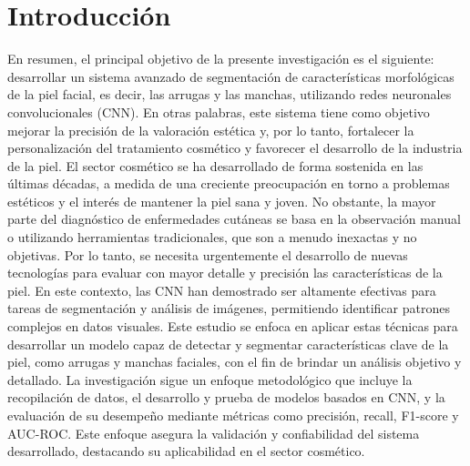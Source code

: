 
\chapter*{Introducción}
En resumen, el principal objetivo de la presente investigación es el siguiente: desarrollar un sistema avanzado de segmentación de características morfológicas de la piel facial, es decir, las arrugas y las manchas, utilizando redes neuronales convolucionales (CNN). En otras palabras, este sistema tiene como objetivo mejorar la precisión de la valoración estética y, por lo tanto, fortalecer la personalización del tratamiento cosmético y favorecer el desarrollo de la industria de la piel.
El sector cosmético se ha desarrollado de forma sostenida en las últimas décadas, a medida de una creciente preocupación en torno a problemas estéticos y el interés de mantener la piel sana y joven. No obstante, la mayor parte del diagnóstico de enfermedades cutáneas se basa en la observación manual o utilizando herramientas tradicionales, que son a menudo inexactas y no objetivas. Por lo tanto, se necesita urgentemente el desarrollo de nuevas tecnologías para evaluar con mayor detalle y precisión las características de la piel.
En este contexto, las CNN han demostrado ser altamente efectivas para tareas de segmentación y análisis de imágenes, permitiendo identificar patrones complejos en datos visuales. Este estudio se enfoca en aplicar estas técnicas para desarrollar un modelo capaz de detectar y segmentar características clave de la piel, como arrugas y manchas faciales, con el fin de brindar un análisis objetivo y detallado.
La investigación sigue un enfoque metodológico que incluye la recopilación de datos, el desarrollo y prueba de modelos basados en CNN, y la evaluación de su desempeño mediante métricas como precisión, recall, F1-score y AUC-ROC. Este enfoque asegura la validación y confiabilidad del sistema desarrollado, destacando su aplicabilidad en el sector cosmético.